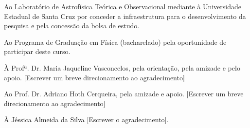 %
\pagestyle{empty}

\begin{agradecimentos}

\begin{incisos}
\item Ao Laboratório de Astrofísica Teórica e Observacional mediante à Universidade Estadual de Santa Cruz por conceder a infraestrutura para o desenvolvimento da pesquisa e pela concessão da bolsa de estudo.
\item Ao Programa de Graduação em Física (bacharelado) pela oportunidade de participar deste curso.
\item À Profª. Dr. Maria Jaqueline Vasconcelos, pela orientação, pela amizade e pelo apoio. [Escrever um breve direcionamento ao agradecimento]
\item Ao Prof. Dr. Adriano Hoth Cerqueira, pela amizade e apoio. [Escrever um breve direcionamento ao agradecimento]
\item À Jéssica Almeida da Silva [Escrever o agradecimento].
\end{incisos}


\end{agradecimentos}
